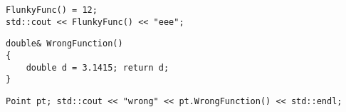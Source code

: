 \begin{lstlisting}
FlunkyFunc() = 12;
std::cout << FlunkyFunc() << "eee";
\end{lstlisting}

\begin{lstlisting}
double& WrongFunction()
{
	double d = 3.1415; return d;
}
\end{lstlisting}

\begin{lstlisting}
Point pt; std::cout << "wrong" << pt.WrongFunction() << std::endl;
\end{lstlisting}


